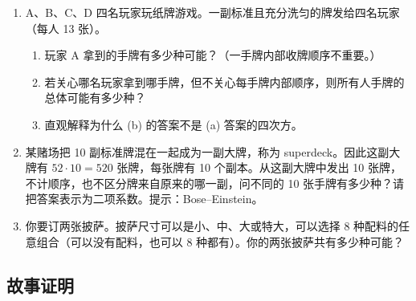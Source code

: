 \documentclass[UTF8,12pt,a4paper,fontset=fandol]{ctexart}
\begin{document}
\begin{enumerate}
  \item A、B、C、D 四名玩家玩纸牌游戏。一副标准且充分洗匀的牌发给四名玩家（每人 13 张）。
  \begin{enumerate}
    \item 玩家 A 拿到的手牌有多少种可能？（一手牌内部收牌顺序不重要。）
    \item 若关心哪名玩家拿到哪手牌，但不关心每手牌内部顺序，则所有人手牌的总体可能有多少种？
    \item 直观解释为什么 (b) 的答案不是 (a) 答案的四次方。
  \end{enumerate}

  \item 某赌场把 10 副标准牌混在一起成为一副大牌，称为 superdeck。因此这副大牌有 $52\cdot 10=520$ 张牌，每张牌有 10 个副本。从这副大牌中发出 10 张牌，不计顺序，也不区分牌来自原来的哪一副，问不同的 10 张手牌有多少种？请把答案表示为二项系数。提示：Bose--Einstein。

  \item 你要订两张披萨。披萨尺寸可以是小、中、大或特大，可以选择 8 种配料的任意组合（可以没有配料，也可以 8 种都有）。你的两张披萨共有多少种可能？
\end{enumerate}

\subsection*{故事证明}
\end{document}
